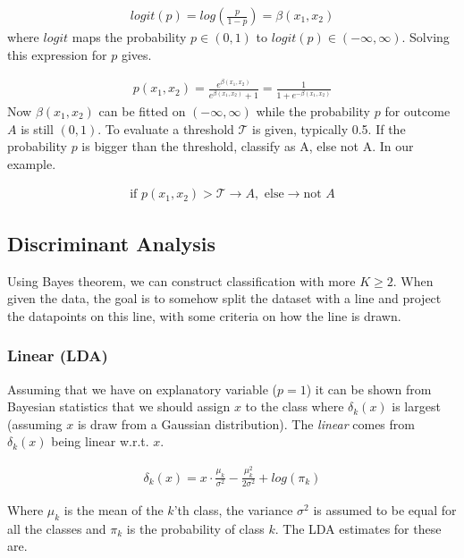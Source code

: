 \documentclass{article}
\begin{document}
\begin{align*}
    logit(p) = log\left(\frac{p}{1-p}\right) = \beta(x_1, x_2)
\end{align*}
where $logit$ maps the probability $p \in (0,1)$ to $logit(p) \in (-\infty, \infty)$. Solving this expression for $p$ gives.

\begin{align*}
    p(x_1, x_2) = \frac{e^{\beta(x_1,x_2)}}{e^{\beta(x_1,x_2)}+1} = \frac{1}{1+e^{-\beta(x_1,x_2)}}
\end{align*}
Now $\beta(x_1,x_2)$ can be fitted on $(-\infty, \infty)$ while the probability $p$ for outcome $A$ is still $(0,1)$. To evaluate a threshold $\mathcal{T}$ is given, typically 0.5. If the probability $p$ is bigger than the threshold, classify as A, else not A. In our example.

\begin{align*}
    \text{if } p(x_1, x_2) > \mathcal{T} \rightarrow A, \text{     else} \rightarrow \text{not } A 
\end{align*}

\subsection{Discriminant Analysis}
Using Bayes theorem, we can construct classification with more $K \geq 2$. When given the data, the goal is to somehow split the dataset with a line and project the datapoints on this line, with some criteria on how the line is drawn. 
\subsubsection{Linear (LDA)}
Assuming that we have on explanatory variable ($p=1$) it can be shown from Bayesian statistics that we should assign $x$ to the class where $\delta_k(x)$ is largest (assuming $x$ is draw from a Gaussian distribution). The \textit{linear} comes from $\delta_k(x)$ being linear w.r.t. $x$.

\begin{align*}
    \delta_k (x) = x \cdot \frac{\mu_k}{\sigma^2} - \frac{\mu_k^2}{2\sigma^2} + log(\pi_k)
\end{align*}

Where $\mu_k$ is the mean of the $k$'th class, the variance $\sigma^2$ is assumed to be equal for all the classes and $\pi_k$ is the probability of class $k$. The LDA estimates for these are.
\end{document}
